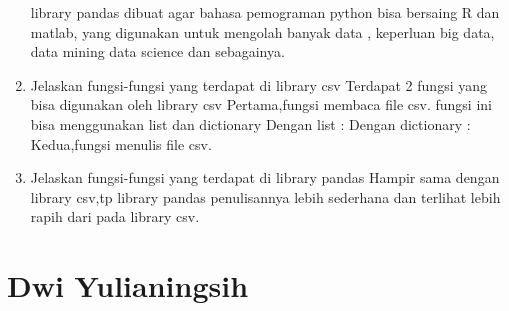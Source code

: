 \begin{enumerate}
    library pandas dibuat agar bahasa pemograman python bisa bersaing R dan matlab, yang digunakan untuk mengolah banyak data , keperluan big data, data mining data science dan sebagainya.
    \item Jelaskan fungsi-fungsi yang terdapat di library csv
    Terdapat 2 fungsi yang bisa digunakan oleh library csv
    Pertama,fungsi membaca file csv.
    fungsi ini bisa menggunakan list dan dictionary
    Dengan list :
    Dengan dictionary :
    Kedua,fungsi menulis file csv.
    \item Jelaskan fungsi-fungsi yang terdapat di library pandas
    Hampir sama dengan library csv,tp library pandas penulisannya lebih sederhana dan terlihat lebih rapih dari pada library csv.
\end{enumerate}

\section{Dwi Yulianingsih}
